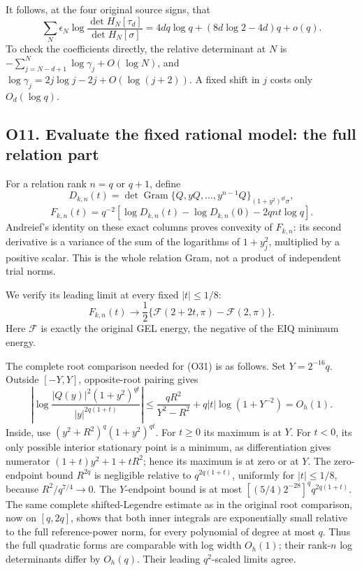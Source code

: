 It follows, at the four original source signs, that \[
\boxed{\sum_N\epsilon_N\log\frac{\det H_N[\tau_d]}{\det H_N[\sigma]}
=4dq\log q+(8d\log2-4d)q+o(q).}\tag{O29}
\] To check the coefficients directly, the relative determinant at \(N\)
is \(-\sum_{j=N-d+1}^{N}\log\gamma_j+O(\log N)\), and
\(\log\gamma_j=2j\log j-2j+O(\log(j+2))\). A fixed shift in \(j\) costs
only \(O_d(\log q)\).

\subsection{O11. Evaluate the fixed rational model: the full relation
part}\label{sa:o11.-evaluate-the-fixed-rational-model-the-full-relation-part}

For a relation rank \(n=q\) or \(q+1\), define \[
D_{k,n}(t)=\det\operatorname{Gram}
\{Q,yQ,\ldots,y^{n-1}Q\}_{(1+y^2)^{qt}\sigma},
\] \[
F_{k,n}(t)=q^{-2}
\left[\log D_{k,n}(t)-\log D_{k,n}(0)-2qnt\log q\right].\tag{O30}
\] Andreief's identity on these exact columns proves convexity of
\(F_{k,n}\): its second derivative is a variance of the sum of the
logarithms of \(1+y_j^2\), multiplied by a positive scalar. This is the
whole relation Gram, not a product of independent trial norms.

We verify its leading limit at every fixed \(|t|\le1/8\): \[
\boxed{F_{k,n}(t)\longrightarrow
\frac12\{\mathcal F(2+2t,\pi)-\mathcal F(2,\pi)\}.}\tag{O31}
\] Here \(\mathcal F\) is exactly the original GEL energy, the negative
of the EIQ minimum energy.

The complete root comparison needed for (O31) is as follows. Set
\(Y=2^{-16}q\). Outside \([-Y,Y]\), opposite-root pairing gives \[
\left|\log\frac{|Q(y)|^2(1+y^2)^{qt}}
{|y|^{2q(1+t)}}\right|
\le \frac{qR^2}{Y^2-R^2}+q|t|\log(1+Y^{-2})=O_h(1).
\tag{O32}
\] Inside, use \((y^2+R^2)^q(1+y^2)^{qt}\). For \(t\ge0\) its maximum is
at \(Y\). For \(t<0\), its only possible interior stationary point is a
minimum, as differentiation gives numerator \((1+t)y^2+1+tR^2\); hence
its maximum is at zero or at \(Y\). The zero-endpoint bound \(R^{2q}\)
is negligible relative to \(q^{2q(1+t)}\), uniformly for \(|t|\le1/8\),
because \(R^2/q^{7/4}\to0\). The \(Y\)-endpoint bound is at most
\([(5/4)2^{-28}]^q q^{2q(1+t)}\). The same complete shifted-Legendre
estimate as in the original root comparison, now on \([q,2q]\), shows
that both inner integrals are exponentially small relative to the full
reference-power norm, for every polynomial of degree at most \(q\). Thus
the full quadratic forms are comparable with log width \(O_h(1)\); their
rank-\(n\) log determinants differ by \(O_h(q)\). Their leading
\(q^2\)-scaled limits agree.

